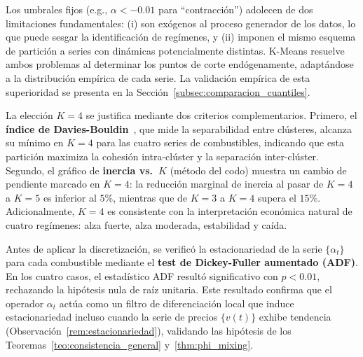 \begin{remark}
\label{obs:kmeans_vs_umbrales}
Los umbrales fijos (e.g., $\alpha < -0.01$ para ``contracción'')
adolecen de dos limitaciones fundamentales: (i) son exógenos al
proceso generador de los datos, lo que puede sesgar la identificación
de regímenes, y (ii) imponen el mismo esquema de partición a series
con dinámicas potencialmente distintas. K-Means resuelve ambos
problemas al determinar los puntos de corte endógenamente,
adaptándose a la distribución empírica de cada serie. La validación
empírica de esta superioridad se presenta en la
Sección~\ref{subsec:comparacion_cuantiles}.
\end{remark}

\begin{remark}
\label{obs:seleccion_K}
La elección $K = 4$ se justifica mediante dos criterios
complementarios.  Primero, el \textbf{índice de
Davies-Bouldin}~\cite{Tsay2010}, que mide la separabilidad
entre clústeres, alcanza su mínimo en $K = 4$ para las cuatro
series de combustibles, indicando que esta partición maximiza la
cohesión intra-clúster y la separación inter-clúster.  Segundo,
el gráfico de \textbf{inercia vs.\ $K$} (método del codo) muestra
un cambio de pendiente marcado en $K = 4$: la reducción marginal de
inercia al pasar de $K = 4$ a $K = 5$ es inferior al $5\%$,
mientras que de $K = 3$ a $K = 4$ supera el $15\%$.
Adicionalmente, $K = 4$ es consistente con la interpretación
económica natural de cuatro regímenes: alza fuerte, alza
moderada, estabilidad y caída.
\end{remark}

\begin{remark}
\label{obs:estacionariedad_alpha}
Antes de aplicar la discretización, se verificó la
estacionariedad de la serie $\{\alpha_t\}$ para cada combustible
mediante el \textbf{test de Dickey-Fuller aumentado (ADF)}.  En
los cuatro casos, el estadístico ADF resultó significativo con
$p < 0.01$, rechazando la hipótesis nula de raíz unitaria.  Este
resultado confirma que el operador $\alpha_t$ actúa como un filtro
de diferenciación local que induce estacionariedad incluso cuando
la serie de precios $\{v(t)\}$ exhibe tendencia
(Observación~\ref{rem:estacionariedad}), validando las hipótesis
de los Teoremas~\ref{teo:consistencia_general}
y~\ref{thm:phi_mixing}.
\end{remark}
